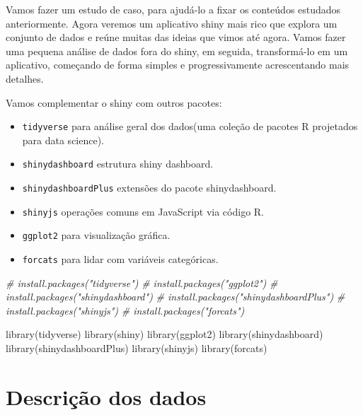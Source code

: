 \documentclass[
]{book}
\newenvironment{Shaded}{\begin{snugshade}}{\end{snugshade}}
\newcommand{\CommentTok}[1]{\textcolor[rgb]{0.56,0.35,0.01}{\textit{#1}}}
\newcommand{\FunctionTok}[1]{\textcolor[rgb]{0.00,0.00,0.00}{#1}}
\newcommand{\NormalTok}[1]{#1}
\providecommand{\tightlist}{%
  \setlength{\itemsep}{0pt}\setlength{\parskip}{0pt}}
\begin{document}
Vamos fazer um estudo de caso, para ajudá-lo a fixar os conteúdos estudados anteriormente. Agora veremos um aplicativo shiny mais rico que explora um conjunto de dados e reúne muitas das ideias que vimos até agora. Vamos fazer uma pequena análise de dados fora do shiny, em seguida, transformá-lo em um aplicativo, começando de forma simples e progressivamente acrescentando mais detalhes.

Vamos complementar o shiny com outros pacotes:

\begin{itemize}
\tightlist
\item
  \texttt{tidyverse} para análise geral dos dados(uma coleção de pacotes R projetados para data science).
\item
  \texttt{shinydashboard} estrutura shiny dashboard.
\item
  \texttt{shinydashboardPlus} extensões do pacote shinydashboard.
\item
  \texttt{shinyjs} operações comuns em JavaScript via código R.
\item
  \texttt{ggplot2} para visualização gráfica.
\item
  \texttt{forcats} para lidar com variáveis categóricas.
\end{itemize}

\begin{Shaded}
\begin{Highlighting}[]
\CommentTok{\# install.packages("tidyverse")}
\CommentTok{\# install.packages("ggplot2")}
\CommentTok{\# install.packages("shinydashboard")}
\CommentTok{\# install.packages("shinydashboardPlus")}
\CommentTok{\# install.packages("shinyjs")}
\CommentTok{\# install.packages("forcats")}

\FunctionTok{library}\NormalTok{(tidyverse)}
\FunctionTok{library}\NormalTok{(shiny)}
\FunctionTok{library}\NormalTok{(ggplot2)}
\FunctionTok{library}\NormalTok{(shinydashboard)}
\FunctionTok{library}\NormalTok{(shinydashboardPlus)}
\FunctionTok{library}\NormalTok{(shinyjs)}
\FunctionTok{library}\NormalTok{(forcats)}
\end{Highlighting}
\end{Shaded}

\hypertarget{descriuxe7uxe3o-dos-dados}{%
\section{\texorpdfstring{\textbf{Descrição dos dados}}{Descrição dos dados}}\label{descriuxe7uxe3o-dos-dados}}
\end{document}
